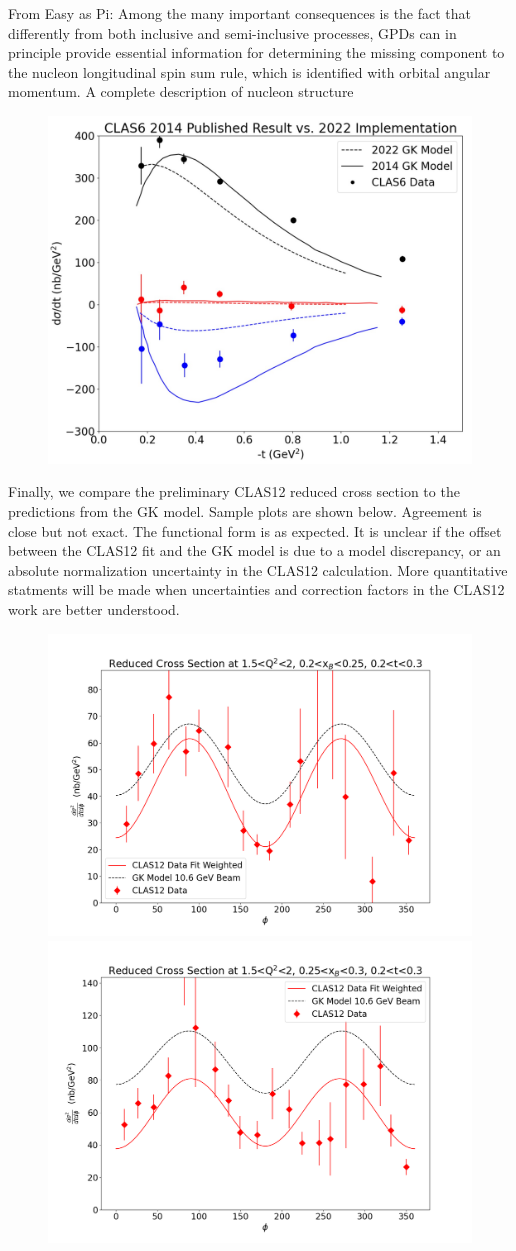     
    From Easy as Pi:
    Among the many important consequences is the fact that differently from both inclusive and semi-inclusive processes, GPDs can in principle provide essential information
    for determining the missing component to the nucleon longitudinal spin sum rule, which
    is identified with orbital angular momentum. A complete description of nucleon structure
    
    
    \begin{figure}[hbt]
    	\centering
    	\includegraphics[page=6,width=0.6\linewidth]{Chapters/Ch5-Further/GK_model/pics/2022_vs_2014_GK_model.jpg}
    \end{figure}\label{fig:oldres2}
    
    Finally, we compare the preliminary CLAS12 reduced cross section to the predictions from the GK model. Sample plots are shown below. Agreement is close but not exact. The functional form is as expected. It is unclear if the offset between the CLAS12 fit and the GK model is due to a model discrepancy, or an absolute normalization uncertainty in the CLAS12 calculation. More quantitative statments will be made when uncertainties and correction factors in the CLAS12 work are better understood.
    \begin{figure}[hbt]
    	\centering
    	\includegraphics[page=6,width=0.45\linewidth]{Chapters/Ch5-Further/GK_model/pics/reduced_xsec_1.5_2_0.2_0.25_0.2_0.3.png}
    	\includegraphics[page=6,width=0.45\linewidth]{Chapters/Ch5-Further/GK_model/pics/reduced_xsec_1.5_2_0.25_0.3_0.2_0.3.png}
    \end{figure}\label{fig:oldres4}

